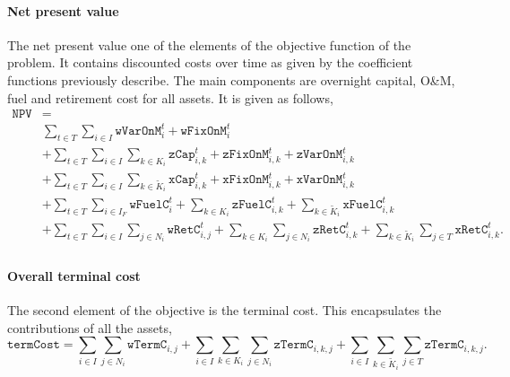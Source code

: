 \documentclass{amsart}
\begin{document}
\paragraph{Net present value}
The net present value one of the elements of the  objective function of the
problem. It contains discounted costs over time as given by the coefficient
functions previously describe. The main components are overnight capital, O\&M,
fuel and retirement cost for all assets. It is given as follows,
\begin{equation}
    \begin{split}
        \mathtt{NPV} &= \\
        & \sum_{t\in T} \sum_{i\in I} 
        \mathtt{wVarOnM}^t_{i}
        +\mathtt{wFixOnM}^t_{i} \\
        &+ \sum_{t\in T} \sum_{i\in I} \sum_{k\in K_i} 
        \mathtt{zCap}^t_{i,k}
        + \mathtt{zFixOnM}^t_{i,k} 
        + \mathtt{zVarOnM}^t_{i,k} \\
        &+ \sum_{t\in T} \sum_{i\in I} \sum_{k\in \tilde{K}_i} 
        \mathtt{xCap}^t_{i,k} 
        + \mathtt{xFixOnM}^t_{i,k} 
        + \mathtt{xVarOnM}^t_{i,k} \\
        &+ \sum_{t\in T} \sum_{i\in I_F} 
        \mathtt{wFuelC}^t_{i} 
        + \sum_{k\in K_i} \mathtt{zFuelC}^t_{i,k} 
        + \sum_{k\in \tilde{K}_i} \mathtt{xFuelC}^t_{i,k}   \\
        &+ \sum_{t\in T} \sum_{i\in I} 
        \sum_{j\in N_i} \mathtt{wRetC}^t_{i,j} 
        + \sum_{k\in K_i} \sum_{j\in N_i} \mathtt{zRetC}^t_{i,k} 
        + \sum_{k\in \tilde{K}_i} \sum_{j\in T} \mathtt{xRetC}^t_{i,k}.   \\
    \end{split}
\end{equation}

\paragraph{Overall terminal cost}
The second element of the objective is the terminal cost. This encapsulates the
contributions of all the assets, 
\begin{equation}
    \mathtt{termCost} = 
    \sum_{i\in I} \sum_{j\in N_i} \mathtt{wTermC}_{i,j}
    + \sum_{i\in I} \sum_{k\in K_i} \sum_{j\in N_i} \mathtt{zTermC}_{i,k,j}
    + \sum_{i\in I} \sum_{k\in \tilde{K}_i} \sum_{j\in T} 
    \mathtt{zTermC}_{i,k,j}.
\end{equation}
\end{document}
